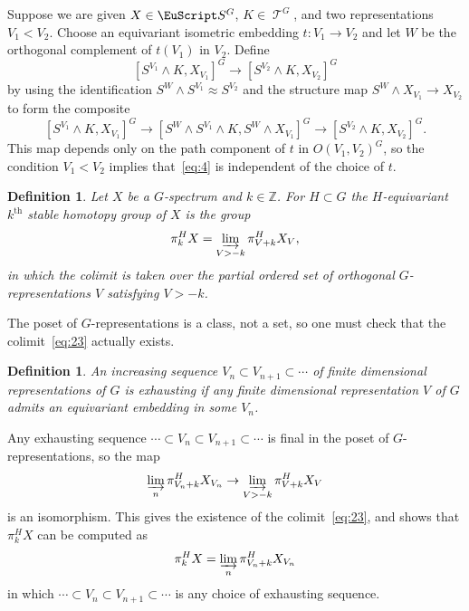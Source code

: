 \documentclass{amsart}
\newtheorem{definition}[equation]{Definition}
\newenvironment{defin}{\begin{definition}\rm}{\end{definition}}
\theoremstyle{definition}
\newtheorem{defin}[equation]{Definition}
\theoremstyle{remark}
\newcommand{\Z}{{\mathbb Z}}
\newcommand{\spectra}{\EuScript S}
\DeclareMathOperator{\spaces}{\mathcal T}
\newcommand{\ugspaces}[1]{\spaces^{#1}}
\newcommand{\ugspectra}[1]{\spectra^{#1}}
\begin{document}
Suppose we are given $X\in\ugspectra{G}$, $K\in\ugspaces{G}$, and two
representations $V_{1}<V_{2}$.  Choose an equivariant isometric
embedding $t:V_{1}\to V_{2}$ and let $W$ be the orthogonal complement
of $t(V_{1})$ in $V_{2}$.  Define
\begin{equation}
\label{eq:4}
[S^{V_{1}}\wedge K,X_{V_{1}}]^{G} \to 
[S^{V_{2}}\wedge K,X_{V_{2}}]^{G}
\end{equation}
by using the identification $S^{W}\wedge S^{V_{1}}\approx S^{V_{2}}$
and the structure map $S^{W}\wedge X_{V_{1}}\to X_{V_{2}}$ to form the composite 
\[
[S^{V_{1}}\wedge K,X_{V_{1}}]^{G}\to
[S^{W}\wedge S^{V_{1}}\wedge K,S^{W}\wedge X_{V_{1}}]^{G}\to
[S^{V_{2}}\wedge K,X_{V_{2}}]^{G}.
\]
This map depends only on the path component of $t$ in
$O(V_{1},V_{2})^{G}$, so the condition $V_{1}<V_{2}$ implies
that~\eqref{eq:4} is independent of the choice of $t$.

\begin{defin}
Let $X$ be a $G$-spectrum and $k\in\Z$.  For $H\subset G$ the {\em
$H$-equivariant $k^{\text{th}}$ stable homotopy group of $X$} is the
group
\begin{equation}
\label{eq:23}
\pi_{k}^{H}X = \varinjlim_{V> -k}\pi^{H}_{V+k}X_{V},
\end{equation}
in which the colimit is taken over the partial ordered set of
orthogonal $G$-representations $V$ satisfying $V>-k$.
\end{defin}

The poset of $G$-representations is a class, not a set, so one must
check that the colimit~\eqref{eq:23} actually exists.

\begin{defin}
\label{def:8}
An increasing sequence $V_{n}\subset V_{n+1}\subset\cdots$ of
finite dimensional representations of $G$ is {\em exhausting} if any
finite dimensional representation $V$ of $G$ admits an equivariant
embedding in some $V_{n}$.
\end{defin}

Any exhausting sequence $\cdots\subset V_{n}\subset
V_{n+1}\subset\cdots$ is final in the poset of $G$-representations, so
the map
\[
\varinjlim_{n}\pi^{H}_{V_{n}+k}X_{V_{n}} \to 
\varinjlim_{V> -k}\pi^{H}_{V+k}X_{V}
\]
is an isomorphism.   This gives the existence of the
colimit~\eqref{eq:23}, and shows that $\pi_{k}^{H}X$ can be computed as 
\[
\pi_{k}^{H}X = \varinjlim_{n}\pi^{H}_{V_{n}+k}X_{V_{n}} 
\]
in which $\cdots\subset V_{n}\subset V_{n+1}\subset\cdots$ is any
choice of exhausting sequence.
\end{document}
